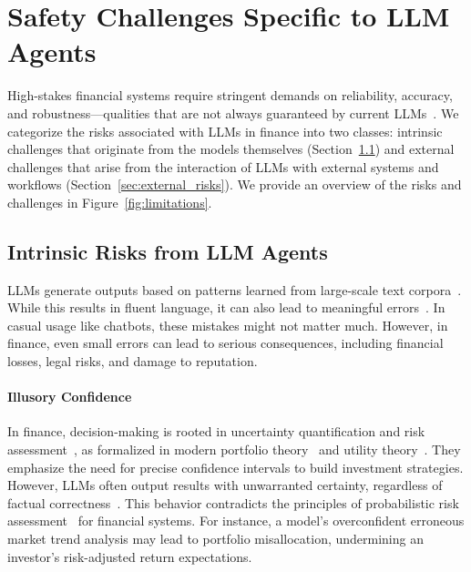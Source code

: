 
\section{Safety Challenges Specific to LLM Agents}\label{sec:safety_challenges}



High-stakes financial systems require stringent demands on reliability, accuracy, and robustness—qualities that are not always guaranteed by current LLMs~\citep{nie2024survey}. We categorize the risks associated with LLMs in finance into two classes: intrinsic challenges that originate from the models themselves (Section~\ref{sec:intrinsic_risks}) and external challenges that arise from the interaction of LLMs with external systems and workflows (Section~\ref{sec:external_risks}). We provide an overview of the risks and challenges in Figure~\ref{fig:limitations}.



\subsection{Intrinsic Risks from LLM Agents}\label{sec:intrinsic_risks}

LLMs generate outputs based on patterns learned from large-scale text corpora~\citep{naveed2023comprehensive,zhao2023survey,liu2024understanding}. While this results in fluent language, it can also lead to meaningful errors~\citep{marchisio2024understanding}. In casual usage like chatbots, these mistakes might not matter much. However, in finance, even small errors can lead to serious consequences, including financial losses, legal risks, and damage to reputation.

\paragraph{Illusory Confidence}

In finance, decision-making is rooted in uncertainty quantification and risk assessment~\citep{fadina2024framework}, as formalized in modern portfolio theory~\citep{elton2009modern} and utility theory~\citep{stigler1950development}. They emphasize the need for precise confidence intervals to build investment strategies. However, LLMs often output results with unwarranted certainty, regardless of factual correctness~\citep{tanneru2024quantifying,xiongcan}. 
This behavior contradicts the principles of probabilistic risk assessment~\citep{bedford2001probabilistic} for financial systems. 
For instance, a model's overconfident erroneous market trend analysis may lead to portfolio misallocation, undermining an investor's risk-adjusted return expectations.

